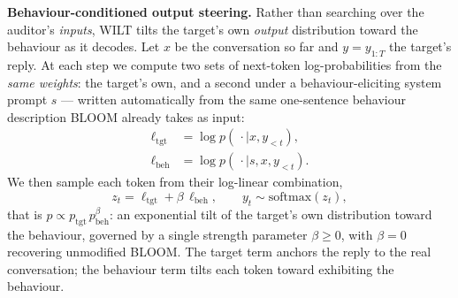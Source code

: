 \documentclass{article}
\theoremstyle{plain}
\theoremstyle{definition}
\theoremstyle{remark}
\begin{document}


\textbf{Behaviour-conditioned output steering.}
Rather than searching over the auditor's \emph{inputs}, WILT tilts the target's own \emph{output} distribution toward the behaviour as it decodes.
Let $x$ be the conversation so far and $y = y_{1:T}$ the target's reply.
At each step we compute two sets of next-token log-probabilities from the \emph{same weights}: the target's own, and a second under a behaviour-eliciting system prompt $s$ --- written automatically from the same one-sentence behaviour description BLOOM already takes as input:
\begin{align}
  \ell_{\mathrm{tgt}} &= \log p(\,\cdot \mid x, y_{<t}), \label{eq:ltgt}\\
  \ell_{\mathrm{beh}} &= \log p(\,\cdot \mid s, x, y_{<t}). \label{eq:lbeh}
\end{align}
We then sample each token from their log-linear combination,
\begin{equation}\label{eq:steer}
  z_t = \ell_{\mathrm{tgt}} + \beta\,\ell_{\mathrm{beh}}, \qquad
  y_t \sim \mathrm{softmax}(z_t),
\end{equation}
that is $p \propto p_{\mathrm{tgt}}\,p_{\mathrm{beh}}^{\beta}$: an exponential tilt of the target's own distribution toward the behaviour, governed by a single strength parameter $\beta \ge 0$, with $\beta = 0$ recovering unmodified BLOOM.
The target term anchors the reply to the real conversation; the behaviour term tilts each token toward exhibiting the behaviour.
\end{document}
